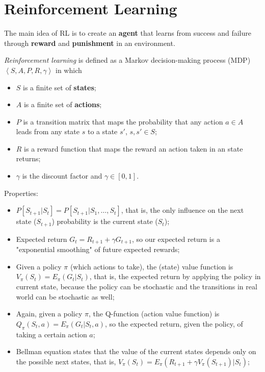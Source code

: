 \documentclass[a4paper]{report}
\begin{document}
\section*{Reinforcement Learning}

The main idea of RL is to create an \textbf{agent} that learns from success and failure through \textbf{reward} and \textbf{punishment} in an environment.

\begin{definition}
    \emph{Reinforcement learning} is defined as a Markov decision-making process (MDP) $\left< S, A, P, R, \gamma \right>$ in which
     \begin{itemize}
	 \item $S$ is a finite set of \textbf{states};
	 \item $A$ is a finite set of \textbf{actions};
	 \item $P$ is a transition matrix that maps the probability that any action $a\in A$ leads from any state $s$ to a state $s'$, $s,s' \in S$;
	 \item $R$ is a reward function that maps the reward an action taken in an state returns;
	 \item $\gamma$ is the discount factor and $\gamma\in \left[ 0,1 \right] $.
    \end{itemize}
\end{definition}

Properties:
\begin{itemize}
    \item $P\left[ S_{t+1} | S_t \right] = P\left[ S_{t+1} | S_1,\ldots,S_t \right] $, that is, the only influence on the next state ($S_{t+1}$) probability is the current state ($S_t$);
    \item Expected return $G_t = R_{t+1} + \gamma G_{t+1}$, so our expected return is a "exponential smoothing" of future expected rewards;
    \item Given a policy $\pi$ (which actions to take), the (state) value function is $V_\pi(S_t) = E_\pi\left( G_t | S_t \right) $, that is, the expected return by applying the policy in current state, because the policy can be stochastic and the transitions in real world can be stochastic as well;
    \item Again, given a policy $\pi$, the Q-function (action value function) is $Q_\pi(S_t, a) = E_\pi(G_t | S_t, a)$, so the expected return, given the policy, of taking a certain action $a $;
    \item Bellman equation states that the value of the current states depends only on the possible next states, that is, $V_\pi(S_t) = E_\pi\left( R_{t+1}+\gamma V_\pi(S_{t+1}) | S_t \right) $;
\end{itemize}
\end{document}

